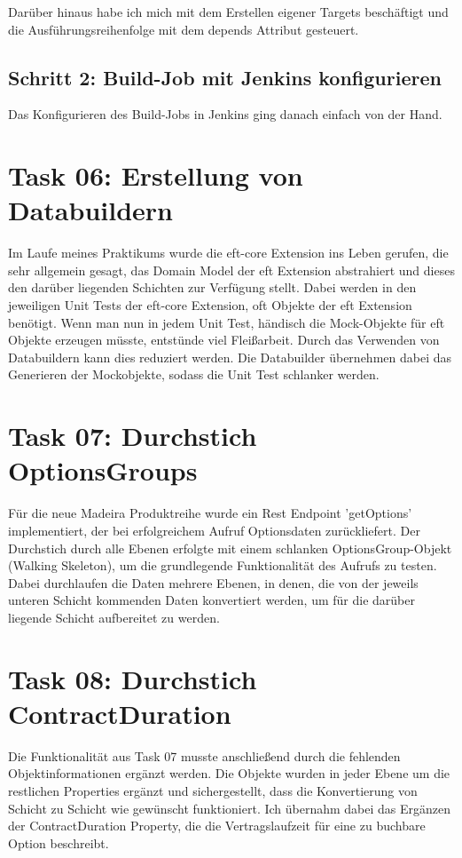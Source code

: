\documentclass[11pt,a4paper]{article}
\begin{document}
Darüber hinaus habe ich mich mit dem Erstellen eigener Targets beschäftigt und
die Ausführungsreihenfolge mit dem depends Attribut gesteuert.

\subsection{Schritt 2: Build-Job mit Jenkins konfigurieren}

Das Konfigurieren des Build-Jobs in Jenkins ging danach einfach von der Hand.



\section{Task 06: Erstellung von Databuildern}

Im Laufe meines Praktikums wurde die eft-core Extension ins Leben gerufen, die sehr allgemein gesagt,
das Domain Model der eft Extension abstrahiert und dieses den darüber liegenden Schichten zur Verfügung stellt.
Dabei werden in den jeweiligen Unit Tests der eft-core Extension, oft Objekte der eft Extension benötigt.
Wenn man nun in jedem Unit Test, händisch die Mock-Objekte für eft Objekte erzeugen müsste, entstünde viel 
Fleißarbeit. Durch das Verwenden von Databuildern kann dies reduziert werden. Die Databuilder übernehmen dabei das
Generieren der Mockobjekte, sodass die Unit Test schlanker werden.



\section{Task 07: Durchstich OptionsGroups}

Für die neue Madeira Produktreihe wurde ein Rest Endpoint 'getOptions' implementiert,
der bei erfolgreichem Aufruf Optionsdaten zurückliefert.
Der Durchstich durch alle Ebenen erfolgte mit einem schlanken OptionsGroup-Objekt (Walking Skeleton), um 
die grundlegende Funktionalität des Aufrufs zu testen.
Dabei durchlaufen die Daten mehrere Ebenen, in denen, die von der jeweils unteren Schicht kommenden Daten
konvertiert werden, um für die darüber liegende Schicht aufbereitet zu werden.


\section{Task 08: Durchstich ContractDuration}

Die Funktionalität aus Task 07 musste anschließend durch die fehlenden Objektinformationen ergänzt werden.
Die Objekte wurden in jeder Ebene um die restlichen
Properties ergänzt und sichergestellt, dass die Konvertierung von Schicht zu Schicht
wie gewünscht funktioniert. Ich übernahm dabei das Ergänzen der ContractDuration Property,
die die Vertragslaufzeit für eine zu buchbare Option beschreibt.
\end{document}
